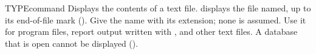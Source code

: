 \begin{XbaseEntry}{TYPE}{command}
Displays the contents of a text file.
\Syntax
{}
\Usage
{} displays the file named, up to its end-of-file mark
().  Give the name with its extension; none is assumed.  Use it
for program files, report output written with , and other text
files.  A database that is open cannot be displayed
().
\Examples
{}
\end{XbaseEntry}

